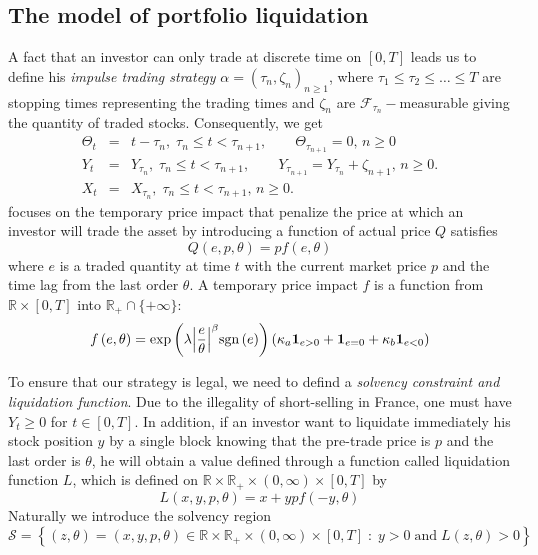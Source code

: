 \documentclass[a4paper,10pt]{article}
\begin{document}
\subsection{The model of portfolio liquidation}
A fact that an investor can only trade at discrete time on $[0, T]$ leads us to define his {\it impulse trading strategy} $\alpha = \left(\tau_n, \zeta_n\right)_{n\ge 1}$, where $\tau_1 \le \tau_2 \le \ldots \le T$ are stopping times representing the trading times and $\zeta_n$ are $\mathcal{F}_{\tau_n}-$measurable giving the quantity of traded stocks. Consequently, we get
\begin{eqnarray}
\Theta_t &=& t - \tau_n, \; \tau_n \le t < \tau_{n+1}, \qquad \Theta_{\tau_{n+1}} = 0, \, n\ge 0
\nonumber
\\
Y_t &=& Y_{\tau_n}, \; \tau_n \le t < \tau_{n+1}, \qquad Y_{\tau_{n+1}} = Y_{\tau_{n}} + \zeta_{n+1}, \, n\ge 0.
\nonumber
\\
X_t &=& X_{\tau_n}, \; \tau_n \le t < \tau_{n+1}, \, n\ge 0.
\nonumber
\end{eqnarray}
\cite{KP} focuses on the temporary price impact that penalize the price at which an investor will trade the asset by introducing a function of actual price $Q$ satisfies
\[
Q(e, p, \theta) = p f(e,\theta)
\]
where $e$ is a traded quantity at time $t$ with the current market price $p$ and the time lag from the last order $\theta$. A temporary price impact $f$ is a function from $\mathbb{R}\times [0, T]$ into $\mathbb{R}_+ \cap \{+\infty\}$:
\[
f\left( {e,\theta } \right) = 
\exp \left( 
{\lambda {{\left| {\frac{e}{\theta }} \right|}^\beta }{\mathop{\rm sgn}} \left( e \right)} \right)
\left( {{\kappa_a}{\mathbf{1}_{e > 0}} + {\mathbf{1}_{e = 0}} + {\kappa_b}{\mathbf{1}_{e < 0}}} \right)
\]
\par To ensure that our strategy is legal, we need to defind a {\it solvency constraint and liquidation function}. Due to the illegality of short-selling in France, one must have $Y_t \ge 0$ for $t \in [0, T]$. In addition, if an investor want to liquidate immediately his stock position $y$ by a single block knowing that the pre-trade price is $p$ and the last order is $\theta$, he will obtain a value defined through a function called liquidation function $L$, which is defined on $\mathbb{R}\times\mathbb{R}_+\times (0,\infty)\times [0, T]$ by
\[
L(x, y, p, \theta) = x + ypf(-y,\theta)
\]  
Naturally we introduce the solvency region
\[
\mathcal{S} = \left\{(z, \theta) = (x, y, p, \theta) \in \mathbb{R}\times\mathbb{R}_+\times (0,\infty)\times [0, T] \; : \; y > 0 \;  \textrm{and} \; L(z, \theta) > 0\right\}
\]
\end{document}

